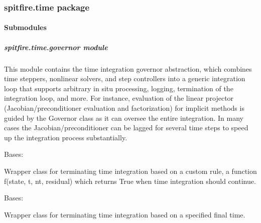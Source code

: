 \documentclass[letterpaper,10pt,english]{sphinxmanual}
\begin{document}
\subsubsection{spitfire.time package}
\label{\detokenize{spitfire.time:spitfire-time-package}}\label{\detokenize{spitfire.time::doc}}

\paragraph{Submodules}
\label{\detokenize{spitfire.time:submodules}}

\subparagraph{spitfire.time.governor module}
\label{\detokenize{spitfire.time.governor:module-spitfire.time.governor}}\label{\detokenize{spitfire.time.governor:spitfire-time-governor-module}}\label{\detokenize{spitfire.time.governor::doc}}
This module contains the time integration governor abstraction,
which combines time steppers, nonlinear solvers, and step controllers into a generic integration loop
that supports arbitrary in situ processing, logging, termination of the integration loop, and more.
For instance, evaluation of the linear projector (Jacobian/preconditioner evaluation and factorization)
for implicit methods is guided by the Governor class as it can oversee the entire integration.
In many cases the Jacobian/preconditioner can be lagged for several time steps to speed up the integration process substantially.

\begin{fulllineitems}
\label{\detokenize{spitfire.time.governor:spitfire.time.governor.CustomTermination}}
Bases: 

Wrapper class for terminating time integration based on a custom rule, a function f(state, t, nt, residual)
which returns True when time integration should continue.

\end{fulllineitems}


\begin{fulllineitems}
\label{\detokenize{spitfire.time.governor:spitfire.time.governor.FinalTime}}
Bases: 

Wrapper class for terminating time integration based on a specified final time.

\end{fulllineitems}
\end{document}
